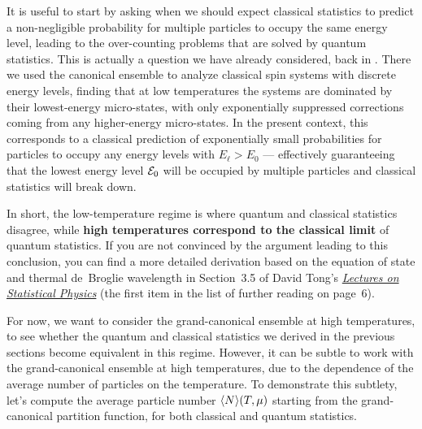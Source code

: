 It is useful to start by asking when we should expect classical statistics to predict a non-negligible probability for multiple particles to occupy the same energy level, leading to the over-counting problems that are solved by quantum statistics.
This is actually a question we have already considered, back in .
There we used the canonical ensemble to analyze classical spin systems with discrete energy levels, finding that at low temperatures the systems are dominated by their lowest-energy micro-states, with only exponentially suppressed corrections coming from any higher-energy micro-states.
In the present context, this corresponds to a classical prediction of exponentially small probabilities for particles to occupy any energy levels with $E_{\ell} > E_0$ --- effectively guaranteeing that the lowest energy level $\mathcal E_0$ will be occupied by multiple particles and classical statistics will break down.

In short, the low-temperature regime is where quantum and classical statistics disagree, while \textbf{high temperatures correspond to the classical limit} of quantum statistics.
If you are not convinced by the argument leading to this conclusion, you can find a more detailed derivation based on the equation of state and thermal de~Broglie wavelength in Section~3.5 of David Tong's \href{https://www.damtp.cam.ac.uk/user/tong/statphys.html}{\textit{Lectures on Statistical Physics}} (the first item in the list of further reading on page~6).

For now, we want to consider the grand-canonical ensemble at high temperatures, to see whether the quantum and classical statistics we derived in the previous sections become equivalent in this regime.
However, it can be subtle to work with the grand-canonical ensemble at high temperatures, due to the dependence of the average number of particles on the temperature.
To demonstrate this subtlety, let's compute the average particle number $\left\langle N \right\rangle\!(T, \mu)$ starting from the grand-canonical partition function, for both classical and quantum statistics.

